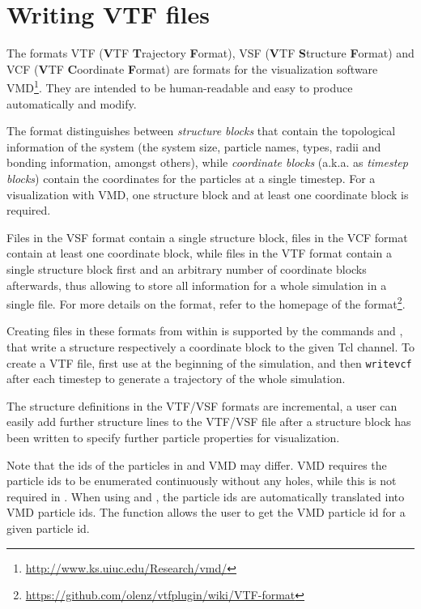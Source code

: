 \section{Writing VTF files}
\label{sec:vtf}

The formats VTF (\textbf{V}TF \textbf{T}rajectory \textbf{F}ormat),
VSF (\textbf{V}TF \textbf{S}tructure \textbf{F}ormat) and VCF
(\textbf{V}TF \textbf{C}oordinate \textbf{F}ormat) are formats for the
visualization software
VMD\cite{humphrey96a}\footnote{\url{http://www.ks.uiuc.edu/Research/vmd/}}. They
are intended to be human-readable and easy to produce automatically
and modify.

The format distinguishes between \emph{structure blocks} that contain
the topological information of the system (\ie the system size,
particle names, types, radii and bonding information, amongst others),
while \emph{coordinate blocks} (a.k.a. as \emph{timestep blocks})
contain the coordinates for the particles at a single timestep.  For a
visualization with VMD, one structure block and at least one
coordinate block is required.

Files in the VSF format contain a single structure block, files in the
VCF format contain at least one coordinate block, while files in the
VTF format contain a single structure block first and an arbitrary
number of coordinate blocks afterwards, thus allowing to store all
information for a whole simulation in a single file. For more details
on the format, refer to the homepage of the
format\footnote{\url{https://github.com/olenz/vtfplugin/wiki/VTF-format}}.

Creating files in these formats from within \es is supported by the
commands  and , that write a structure
respectively a coordinate block to the given Tcl channel. To create a
VTF file, first use  at the beginning of the simulation,
and then \texttt{writevcf} after each timestep to generate a
trajectory of the whole simulation.

The structure definitions in the VTF/VSF formats are incremental, \ie
a user can easily add further structure lines to the VTF/VSF file
after a structure block has been written to specify further particle
properties for visualization.

Note that the ids of the particles in \es and VMD may differ. VMD
requires the particle ids to be enumerated continuously without any
holes, while this is not required in \es. When using 
and , the \es particle ids are automatically translated
into VMD particle ids. The function  allows the user to
get the VMD particle id for a given \es particle id.

